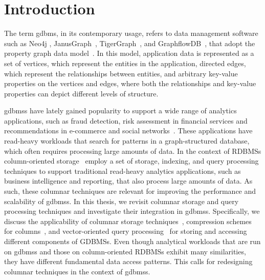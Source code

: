 
\chapter{Introduction}
\label{introduction}

The term \gls{gdbms}, in its contemporary usage, refers to data management software such as Neo4j \cite{neo4j}, JanusGraph~\cite{janusgraph}, TigerGraph~\cite{tigergraph}, and GraphflowDB~\cite{kankanamge:graphflow, mhedhbi:sqs}, that adopt the property graph data model~\cite{neo4j-property-graph-model}. In this model, application data is represented as a set of vertices, which represent the entities in the application, directed edges, which represent the relationships between entities, and arbitrary key-value properties on the vertices and edges, where both the relationships and key-value properties can depict different levels of structure.

\gls{gdbms}s have lately gained popularity to support a wide range of analytics applications, such as fraud detection, risk assessment in financial services and recommendations in e-commerce and social networks~\cite{sahu:survey}. These applications have read-heavy workloads that search for patterns in a graph-structured database, which often requires processing large amounts of data. In the context of RDBMSs column-oriented storage~\cite{monet-2decades, oracle-col, c-store, boncz-vectorwise} employ a set of storage, indexing, and query processing techniques to support traditional read-heavy analytics applications, such as business intelligence and reporting, that also process large amounts of data. As such, these columnar techniques are relevant for improving the performance and scalability of \gls{gdbms}s. In this thesis, we revisit columnar storage and query processing techniques and investigate their integration in \gls{gdbms}s. Specifically, we discuss the applicability of columnar storage techniques~\cite{c-store}, compression schemes for columns~\cite{abadi-col-comp, abadi-sparse-col, boncz-comp}, and vector-oriented query processing~\cite{boncz-monet-vectorized, col-vs-row} for storing and accessing different components of GDBMSs. Even though analytical workloads that are run on \gls{gdbms}s and those on column-oriented RDBMSs exhibit many similarities, they have different fundamental data access patterns. This calls for redesigning columnar techniques in the context of \gls{gdbms}s.

